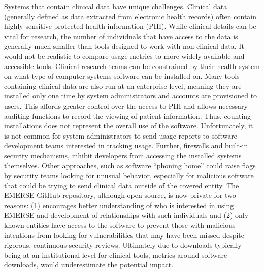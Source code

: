 \documentclass{article}
\begin{document}
Systems that contain clinical data have unique challenges.  Clinical data (generally defined as data extracted from electronic health records) often contain highly sensitive protected health information (PHI). While clinical details can be vital for research, the number of individuals that have access to the data is generally much smaller than tools designed to work with non-clinical data. It would not be realistic to compare usage metrics to more widely available and accessible tools. Clinical research teams can be constrained by their health system on what type of computer systems software can be installed on. Many tools containing clinical data are also run at an enterprise level, meaning they are installed only one time by system administrators and accounts are provisioned to users. This affords greater control over the access to PHI and allows necessary auditing functions to record the viewing of patient information.  Thus, counting installations does not represent the overall use of the software. Unfortunately, it is not common for system administrators to send usage reports to software development teams interested in tracking usage.  Further, firewalls and built-in security mechanisms, inhibit developers from accessing the installed systems themselves. Other approaches, such as software “phoning home” could raise flags by security teams looking for unusual behavior, especially for malicious software that could be trying to send clinical data outside of the covered entity. The EMERSE \cite{hanauer_supporting_2015} GitHub repository, although open source, is now private for two reasons: (1) encourages  better understanding of who is interested in using EMERSE and development of relationships with such individuals and (2)  only known entities have access to the software to prevent those with malicious intentions from looking for vulnerabilities that may have been missed despite rigorous, continuous security reviews.  Ultimately due to downloads typically being at an institutional level for clinical tools, metrics around software downloads, would underestimate the potential impact.  
\end{document}
